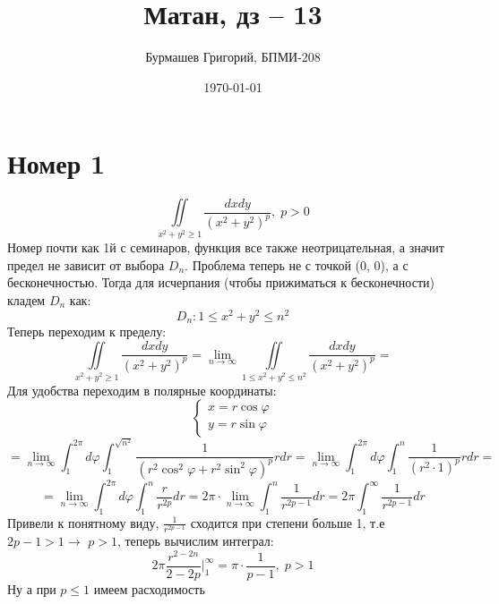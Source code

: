 \documentclass[a4paper,12pt]{article}
\author{Бурмашев Григорий, БПМИ-208}
\title{Матан, дз -- 13}
\date{\today}
\begin{document}
\maketitle
\section*{Номер 1}
\[
\iint\limits_{x^2 + y^2 \geq 1}  \frac{dxdy}{(x^2+y^2)^p}, \; p > 0
\]
Номер почти как 1й с семинаров, функция все также неотрицательная, а значит предел не зависит от выбора $D_n$. Проблема теперь не с точкой (0, 0), а с бесконечностью. Тогда для исчерпания (чтобы прижиматься к бесконечности) кладем $D_n$ как:
\[
D_n : 1 \leq x^2 + y^2 \leq n^2
\]
Теперь переходим к пределу:
\[
\iint\limits_{x^2 + y^2 \geq 1}  \frac{dxdy}{(x^2+y^2)^p} = \lim\limits_{n \rightarrow \infty} \iint\limits_{1 \leq x^2 + y^2 \leq n^2} \frac{dxdy}{(x^2+y^2)^p} = 
\]
Для удобства переходим в полярные координаты:
\[
\begin{cases}
x = r \cos \varphi \\
y = r \sin \varphi 
\end{cases}
\]
\[
=\lim\limits_{n \rightarrow \infty} \int_{1}^{2 \pi} d \varphi \int_1^{\sqrt{n^2}} \frac{ 1}{(r^2 \cos^2 \varphi + r^2 \sin^2 \varphi)^p} rdr = \lim\limits_{n \rightarrow \infty} \int_{1}^{2 \pi} d \varphi \int_1^n \frac{ 1}{(r^2 \cdot 1)^p} rdr  = 
\]
\[
= 
\lim\limits_{n \rightarrow \infty} \int_{1}^{2 \pi} d \varphi \int_1^n \frac{r}{r^{2p}} dr = 2 \pi  \cdot \lim_{n \rightarrow \infty} \int_1^{n} \frac{1}{r^{2p - 1}} dr = 2 \pi \int_1^{\infty} \frac{1}{r^{2p - 1}} dr
\]
Привели к понятному виду, $\frac{1}{r^{2p-1}}$ сходится при степени больше 1, т.е $2p - 1 > 1 \rightarrow $ $p > 1$, теперь вычислим интеграл:
\[
2 \pi \frac{r^{2-2n}}{2-2p} \Bigg|^{\infty}_{1} = \pi \cdot \frac{1}{p - 1}, \; p > 1
\]
Ну а при $p \leq 1$ имеем расходимость 
\clearpage
\end{document}
